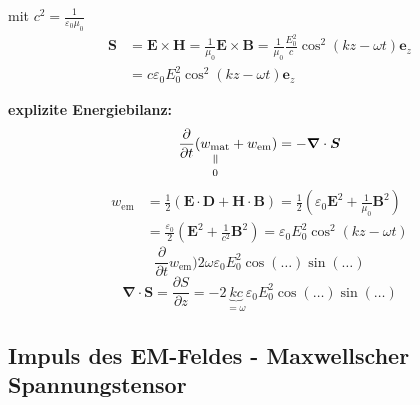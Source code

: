 \documentclass[titlepage,11pt,a4paper,ngerman]{report}
\newcommand{\tx}[1]{\textrm{#1}}
\newcommand{\ub}[1]{\underbrace{#1}}
\newcommand{\verteq}{\rotatebox{90}{$\,=$}}
\newcommand{\equalto}[2]{\underset{\scriptstyle\overset{\mkern4mu\verteq}{#2}}{#1}}
\newcommand{\prt}[2]{\frac{\partial #1}{\partial #2}}
\renewcommand{\vec}[1]{\boldsymbol{#1}}
\renewcommand{\epsilon}{\varepsilon}
\newcommand{\vabla}{\boldsymbol{\nabla}}
\begin{document}

\noindent
mit $ c^2 = \frac{1}{\epsilon_0 \mu_0} $
\begin{align*}
\vec{S} &= \vec{E} \times \vec{H} = \frac{1}{\mu_0} \vec{E} \times \vec{B} = \frac{1}{\mu_0} \frac{E_0^2}{c} \cos^2(kz - \omega t) \vec{e}_z\\
&= c \epsilon_0 E_0^2 \cos^2(kz - \omega t) \vec{e}_z
\end{align*}


\noindent
\textbf{explizite Energiebilanz:}
\begin{equation*}
\prt{}{t} (\equalto{w_{\tx{mat}}}{0} + w_{\tx{em}}) = - \vabla \cdot \vec{S}
\end{equation*}
\begin{align*}
w_{\tx{em}} &= \frac{1}{2} (\vec{E} \cdot \vec{D} + \vec{H} \cdot \vec{B}) = \frac{1}{2} (\epsilon_0 \vec{E}^2 + \frac{1}{\mu_0} \vec{B}^2) \\
&= \frac{\epsilon_0}{2} (\vec{E}^2 + \frac{1}{c^2} \vec{B}^2) = \epsilon_0 E_0^2 \cos^2(kz - \omega t)
\end{align*}
\begin{equation*}
\prt{}{t} w_{\tx{em}} ) 2 \omega \epsilon_0 E_0^2 \cos(\dots) \sin(\dots)
\end{equation*}
\begin{equation*}
\vabla \cdot \vec{S} = \prt{S}{z} = - 2 \ub{kc}_{= \omega} \epsilon_0 E_0^2 \cos(\dots) \sin(\dots)
\end{equation*}

\subsection{Impuls des EM-Feldes - Maxwellscher Spannungstensor}
\end{document}
